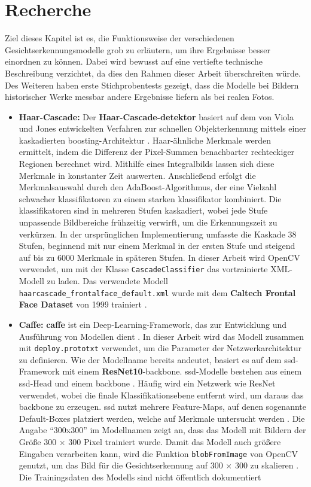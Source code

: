 \chapter{Recherche}
%
Ziel dieses Kapitel ist es, die Funktionsweise der verschiedenen Gesichtserkennungsmodelle grob zu erläutern, um ihre Ergebnisse besser einordnen zu können. Dabei wird bewusst auf eine vertiefte technische Beschreibung verzichtet, da dies den Rahmen dieser Arbeit überschreiten würde. Des Weiteren haben erste Stichprobentests gezeigt, dass die Modelle bei Bildern historischer Werke messbar andere Ergebnisse liefern als bei realen Fotos.

\begin{itemize}
	\item \textbf{Haar-Cascade:} Der \textbf{Haar-Cascade-\gls{detektor}} basiert auf dem von Viola und Jones entwickelten Verfahren zur schnellen Objekterkennung mittels einer kaskadierten \gls{boosting}-Architektur \parencite{ViolaJones2001}. Haar-ähnliche Merkmale werden ermittelt, indem die Differenz der Pixel-Summen benachbarter rechteckiger Regionen berechnet wird. Mithilfe eines Integralbilds lassen sich diese Merkmale in konstanter Zeit auswerten. Anschließend erfolgt die Merkmalsauswahl durch den AdaBoost-Algorithmus, der eine Vielzahl schwacher \gls{klassifikator}en zu einem starken \gls{klassifikator} kombiniert. Die \gls{klassifikator}en sind in mehreren Stufen kaskadiert, wobei jede Stufe unpassende Bildbereiche frühzeitig verwirft, um die Erkennungszeit zu verkürzen. In der ursprünglichen Implementierung umfasste die Kaskade 38 Stufen, beginnend mit nur einem Merkmal in der ersten Stufe und steigend auf bis zu 6000 Merkmale in späteren Stufen. 
In dieser Arbeit wird OpenCV verwendet, um mit der Klasse \texttt{CascadeClassifier} das vortrainierte XML-Modell zu laden. Das verwendete Modell \texttt{haarcascade\_frontalface\_default.xml} wurde mit dem \textbf{Caltech Frontal Face Dataset} von 1999 trainiert \parencite[101–102]{howse2019opencv}.
%
	\item \textbf{Caffe:} \textbf{\gls{caffe}} ist ein Deep-Learning-Framework, das zur Entwicklung und Ausführung von Modellen dient \parencite{JiaSDKLGGD14}. In dieser Arbeit wird das Modell  zusammen mit \texttt{deploy.prototxt} verwendet, um die Parameter der Netzwerkarchitektur zu definieren. Wie der Modellname bereits andeutet, basiert es auf dem \gls{ssd}-Framework mit einem \textbf{ResNet10}-\gls{backbone}. \gls{ssd}-Modelle bestehen aus einem \gls{ssd}-Head und einem \gls{backbone} \parencite{Esri2025SSD}. Häufig wird ein Netzwerk wie ResNet verwendet, wobei die finale Klassifikationsebene entfernt wird, um daraus das \gls{backbone} zu erzeugen. \gls{ssd} nutzt mehrere Feature-Maps, auf denen sogenannte Default-Boxes platziert werden, welche auf Merkmale untersucht werden \parencite{Liu2016}. Die Angabe \enquote{300x300} im Modellnamen zeigt an, dass das Modell mit Bildern der Größe 300 × 300 Pixel trainiert wurde. Damit das Modell auch größere Eingaben verarbeiten kann, wird die Funktion \texttt{blobFromImage} von OpenCV genutzt, um das Bild für die Gesichtserkennung auf 300 × 300 zu skalieren \parencite{sefiks14451}. Die Trainingsdaten des Modells sind nicht öffentlich dokumentiert

\end{itemize}
